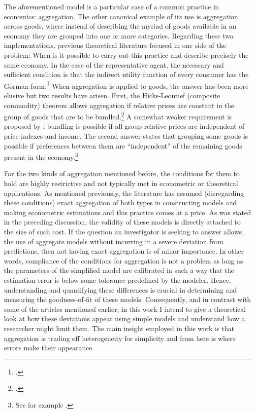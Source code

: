\documentclass[english, a4paper,12pt]{article}
\begin{document}
The aforementioned model is a particular case of a common practice in economics: aggregation. The other canonical example of its use is aggregation across goods, where instead of describing the myriad of goods available in an economy they are grouped into one or more categories. Regarding these two implementations, previous theoretical literature focused in one side of the problem: When is it possible to carry out this practice and describe precisely the same economy. In the case of the representative agent, the necessary and sufficient condition is that the indirect utility function of every consumer has the Gorman form.\footnote{\cite{Gorman53}.} When aggregation is applied to goods, the answer has been more elusive but two results have arisen. First, the Hicks-Leontief (composite commodity) theorem allows aggregation if relative prices are constant in the group of goods that are to be bundled.\footnote{\cite{Leontief36, HicksBook}.} A somewhat weaker requirement is proposed by \cite{Lewbel96}: bundling is possible if all group relative prices are independent of price indexes and income. The second answer states that grouping some goods is possible if preferences between them are ``independent'' of the remaining goods present in the economy.\footnote{See for example \cite{GormanSeparability}.} 

For the two kinds of aggregation mentioned before, the conditions for them to hold are highly restrictive and not typically met in econometric or theoretical applications. As mentioned previously, the literature has assumed (disregarding these conditions) exact aggregation of both types in constructing models and making econometric estimations and this practice comes at a price. As was stated in the preceding discussion, the validity of these models is directly attached to the size of such cost. If the question an investigator is seeking to answer allows the use of aggregate models without incurring in a severe deviation from predictions, then not having exact aggregation is of minor importance. In other words, compliance of the conditions for aggregation is not a problem as long as the parameters of the simplified model are calibrated in such a way that the estimation error is below some tolerance predefined by the modeler. Hence, understanding and quantifying these differences is crucial in determining and measuring the goodness-of-fit of these models. Consequently, and in contrast with some of the articles mentioned earlier, in this work I intend to give a theoretical look at how these deviations appear using simple models and understand how a researcher might limit them. The main insight employed in this work is that aggregation is trading off heterogeneity for simplicity and from here is where errors make their appearance. 
\end{document}
